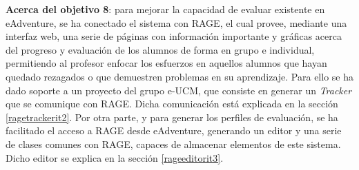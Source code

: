 \textbf{Acerca del objetivo 8}: para mejorar la capacidad de evaluar existente en eAdventure, se ha conectado el sistema con RAGE, el cual provee, mediante una interfaz web, una serie de páginas con información importante y gráficas acerca del progreso y evaluación de los alumnos de forma en grupo e individual, permitiendo al profesor enfocar los esfuerzos en aquellos alumnos que hayan quedado rezagados o que demuestren problemas en su aprendizaje. Para ello se ha dado soporte a un proyecto del grupo e-UCM, que consiste en generar un \textit{Tracker} que se comunique con RAGE. Dicha comunicación está explicada en la sección \ref{ragetrackerit2}. Por otra parte, y para generar los perfiles de evaluación, se ha facilitado el acceso a RAGE desde eAdventure, generando un editor y una serie de clases comunes con RAGE, capaces de almacenar elementos de este sistema. Dicho editor se explica en la sección \ref{rageeditorit3}.

